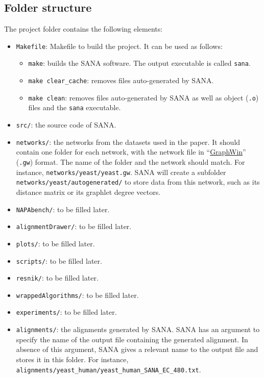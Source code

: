 \documentclass[]{article}
\begin{document}
\subsection{Folder structure}\label{b:struct}
The project folder contains the following elements:
\begin{itemize}
\item\verb|Makefile|: Makefile to build the project. It can be used as follows:
\begin{itemize}
\item\verb|make|: builds the SANA software. The output executable is called \verb|sana|.
\item\verb|make clear_cache|: removes files auto-generated by SANA. 
\item\verb|make clean|: removes files auto-generated by SANA as well as object (\verb|.o|) files and the \verb|sana| executable.
\end{itemize}
\item\verb|src/|: the source code of SANA.
\item\verb|networks/|: the networks from the datasets used in the paper. It should contain one folder for each network, with the network file in ``\href{http://www.algorithmic-solutions.info/leda_manual/gw.html}{GraphWin}'' (\verb'.gw') format. The name of the folder and the network should match. For instance, \verb|networks/yeast/yeast.gw|. SANA will create a subfolder\\ \verb|networks/yeast/autogenerated/| to store data from this network, such as its distance matrix or its graphlet degree vectors.
\item\verb|NAPAbench/|: to be filled later.
\item\verb|alignmentDrawer/|: to be filled later.
\item\verb|plots/|: to be filled later.
\item\verb|scripts/|: to be filled later.
\item\verb|resnik/|: to be filled later.
\item\verb|wrappedAlgorithms/|: to be filled later.
\item\verb|experiments/|: to be filled later.
\item\verb|alignments/|: the alignments generated by SANA. SANA has an argument to specify the name of the output file containing the generated alignment. In absence of this argument, SANA gives a relevant name to the output file and stores it in this folder. For instance,\\ \verb|alignments/yeast_human/yeast_human_SANA_EC_480.txt|.

\end{itemize}
\end{document}
